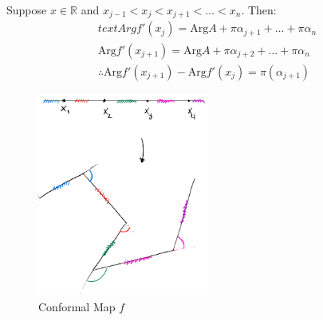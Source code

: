 \begin{example}
    Suppose $x \in \mathbb{R}$ and $x_{j-1} < x_{j} < x_{j+1} < \ldots < x_n$. Then:
    \begin{align*}
        text{Arg}f'(x_{j}) = \text{Arg}A + \pi \alpha_{j + 1} + \ldots + \pi \alpha_n    \\
        \text{Arg}f'(x_{j+1}) = \text{Arg}A + \pi \alpha_{j + 2} + \ldots + \pi \alpha_n \\
        \therefore \text{Arg}f'(x_{j+1}) - \text{Arg}f'(x_{j}) = \pi(\alpha_{j+1})
    \end{align*}
    \begin{figure}[H]
        \centering
        \includegraphics[width=0.5\textwidth]{LECTURE_17/graph8.png}
        \caption{Conformal Map $f$}
    \end{figure}
\end{example}


